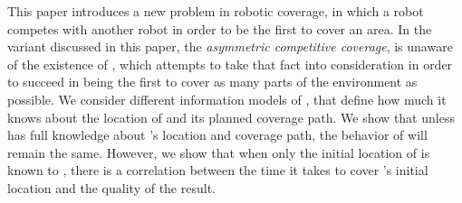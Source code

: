 This paper introduces a new problem in robotic coverage, in which a robot \rob competes with another robot \opp in order to be the first to cover an area. In the variant discussed in this paper, the {\em asymmetric competitive coverage}, \opp is unaware of the existence of \rob, which attempts to take that fact into consideration in order to succeed in being the first to cover as many parts of the environment as possible. We consider different information models of \rob, that define how much it knows about the location of \opp and its planned coverage path. We show that unless \rob has full knowledge about \opp's location and coverage path, the behavior of \rob will remain the same. However, we show that when only the initial location of \opp is known to \rob, there is a correlation between the time it takes \rob to cover \opp's initial location and the quality of the result.
